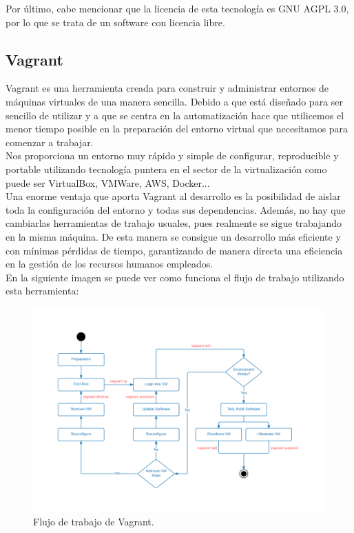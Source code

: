 Por último, cabe mencionar que la licencia de esta tecnología es GNU AGPL 3.0\cite{agpl}, por lo que se trata de un software con licencia
libre.



\subsection{Vagrant}

Vagrant\cite{vagrant} es una herramienta creada para construir y administrar entornos de máquinas virtuales de una 
manera sencilla. Debido a que está diseñado para ser sencillo de utilizar y a que se centra en 
la automatización hace que utilicemos el menor tiempo posible en la preparación del entorno virtual
que necesitamos para comenzar a trabajar.\\

Nos proporciona un entorno muy rápido y simple de configurar, reproducible y portable utilizando
tecnología puntera en el sector de la virtualización como puede ser VirtualBox, VMWare, AWS, Docker...\\

Una enorme ventaja que aporta Vagrant al desarrollo es la posibilidad de aislar toda la configuración
del entorno y todas sus dependencias. Además, no hay que cambiarlas herramientas de trabajo usuales, pues realmente se sigue trabajando en la misma máquina. 
De esta manera se consigue un desarrollo más eficiente y con mínimas pérdidas de tiempo, garantizando 
de manera directa una eficiencia en la gestión de los recursos humanos empleados.\\

En la siguiente imagen se puede ver como funciona el flujo de trabajo utilizando esta herramienta:

\begin{figure}[H]
	\centering
	\includegraphics[scale=0.65]{imagenes/vagrant-workflow.png}
	\caption{Flujo de trabajo de Vagrant.\cite{image-vagrant} \label{fig:figura6}}
\end{figure}



